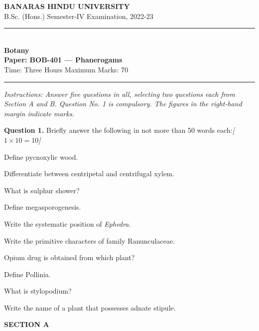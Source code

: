\documentclass[11pt,a4paper]{article}
\newcommand{\pts}[1]{\hfill   \textit{[#1]}}
\begin{document}
\begin{center}
  {\large\bfseries BANARAS HINDU UNIVERSITY}\\[2pt]
  {\normalsize B.Sc. (Hons.) Semester-IV Examination, 2022-23}\\[6pt]
  \rule{0.8\linewidth}{0.5pt}\\[6pt]
  {\large\bfseries Botany}\\[4pt]
  {\large\bfseries Paper: BOB-401 --- Phanerogams}\\[4pt]
  {\normalsize Time: Three Hours \hfill Maximum Marks: 70}
\end{center}

\rule{\linewidth}{0.4pt}

\smallskip



\noindent   \textit{Instructions: Answer five questions in all, selecting two questions each from Section A and B. Question No. 1 is compulsory. The figures in the right-hand margin indicate marks.}

\bigskip

\medskip


\noindent   \textbf{Question 1.} Briefly answer the following in not more than 50 words each:\pts{$1  \times 10 = 10$}

\begin{parts}
  \item Define pycnoxylic wood.
  \item Differentiate between centripetal and centrifugal xylem.
  \item What is sulphur shower?
  \item Define megasporogenesis.
  \item Write the systematic position of   \textit{Ephedra}.
  \item Write the primitive characters of family Ranunculaceae.
  \item Opium drug is obtained from which plant?
  \item Define Pollinia.
  \item What is stylopodium?
  \item Write the name of a plant that possesses adnate stipule.
\end{parts}

\bigskip

\begin{center}
   \textbf{SECTION A}
\end{center}
\medskip

\medskip
\end{document}
